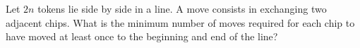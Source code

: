 Let $2n$ tokens lie side by side in a line. A move consists in exchanging two adjacent chips.
What is the minimum number of moves required for each chip to have moved at
least once to the beginning and end of the line?